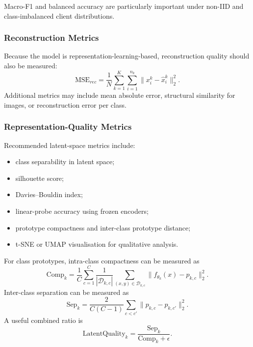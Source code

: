 \documentclass[conference]{IEEEtran}
\begin{document}
Macro-F1 and balanced accuracy are particularly important under non-IID and class-imbalanced client distributions.

\subsubsection{Reconstruction Metrics}
\label{subsubsec:reconstruction-metrics}
Because the model is representation-learning-based, reconstruction quality should also be measured:
\begin{equation}
    \text{MSE}_{rec}
    =
    \frac{1}{N}
    \sum_{k=1}^{K}
    \sum_{i=1}^{n_k}
    \|x_i^k-\hat{x}_i^k\|_2^2.
    \label{eq:auto-096}
\end{equation}
Additional metrics may include mean absolute error, structural similarity for images, or reconstruction error per class.

\subsubsection{Representation-Quality Metrics}
\label{subsubsec:representation-quality-metrics}
Recommended latent-space metrics include:
\begin{itemize}
    \item class separability in latent space;
    \item silhouette score;
    \item Davies--Bouldin index;
    \item linear-probe accuracy using frozen encoders;
    \item prototype compactness and inter-class prototype distance;
    \item t-SNE or UMAP visualisation for qualitative analysis.
\end{itemize}

For class prototypes, intra-class compactness can be measured as
\begin{equation}
    \text{Comp}_k
    =
    \frac{1}{C}
    \sum_{c=1}^{C}
    \frac{1}{|\mathcal{D}_{k,c}|}
    \sum_{(x,y)\in\mathcal{D}_{k,c}}
    \|f_{\theta_k}(x)-p_{k,c}\|_2^2.
    \label{eq:auto-097}
\end{equation}
Inter-class separation can be measured as
\begin{equation}
    \text{Sep}_k
    =
    \frac{2}{C(C-1)}
    \sum_{c<c'}
    \|p_{k,c}-p_{k,c'}\|_2^2.
    \label{eq:auto-098}
\end{equation}
A useful combined ratio is
\begin{equation}
    \text{LatentQuality}_k = \frac{\text{Sep}_k}{\text{Comp}_k+\epsilon}.
    \label{eq:auto-099}
\end{equation}
\end{document}
